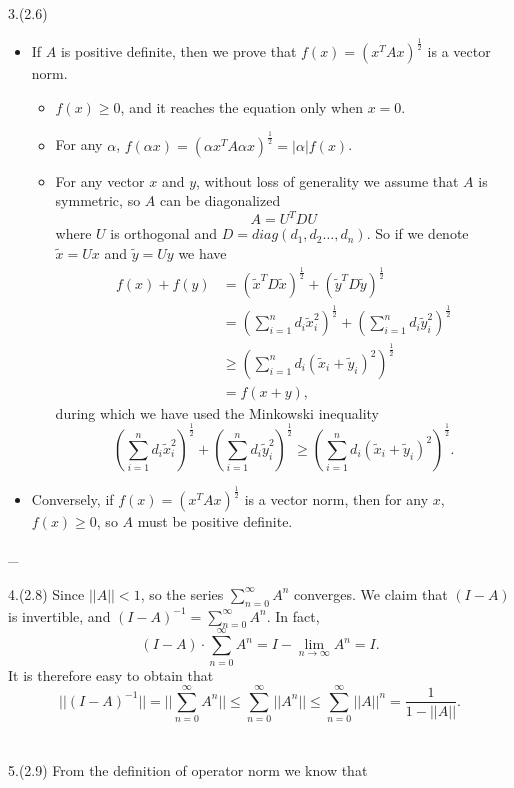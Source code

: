 \documentclass[11pt]{article}
\begin{document}
\\\\
3.(2.6)
\begin{itemize}
	\item If $A$ is positive definite, then we prove that $f(x)=\left(x^T A x\right)^{\frac{1}{2}}$ is a vector norm.
	\begin{itemize}
		\item $f(x) \ge 0$, and it reaches the equation only when $x=0$.
		\item For any $\alpha$, $f(\alpha x)=\left(\alpha x^T A \alpha x \right)^{\frac{1}{2}}=|\alpha|f(x)$.
		\item For any vector $x$ and $y$, without loss of generality we assume that $A$ is symmetric, so $A$ can be diagonalized $$A=U^TDU$$ where $U$ is orthogonal and $D=diag(d_1, d_2 \dots, d_n)$. So if we denote $\tilde{x} = Ux$ and $\tilde{y}=Uy$ we have 
		\begin{align*}
		f(x)+f(y) &= (\tilde{x}^TD\tilde{x})^{\frac{1}{2}}+(\tilde{y}^TD\tilde{y})^{\frac{1}{2}} \\
		&=\left(\sum_{i=1}^n d_i \tilde{x}^2_i\right)^{\frac{1}{2}} + \left(\sum_{i=1}^n d_i \tilde{y}^2_i\right)^{\frac{1}{2}} \\
		&\ge \left(\sum_{i=1}^n d_i (\tilde{x}_i+\tilde{y}_i)^2\right)^{\frac{1}{2}} \\
		&= f(x+y),
		\end{align*}
		during which we have used the Minkowski inequality $$\left(\sum_{i=1}^n d_i \tilde{x}^2_i\right)^{\frac{1}{2}} + \left(\sum_{i=1}^n d_i \tilde{y}^2_i\right)^{\frac{1}{2}} \ge \left(\sum_{i=1}^n d_i (\tilde{x}_i+\tilde{y}_i)^2\right)^{\frac{1}{2}}.$$
	\end{itemize}
	\item Conversely, if $f(x)=\left( x^T A  x \right)^{\frac{1}{2}}$ is a vector norm, then for any $x$, $f(x) \ge 0$, so $A$ must be positive definite.
\end{itemize}
\_
\\\\
4.(2.8) Since $||A|| < 1$, so the series $\sum_{n=0}^{\infty} A^n$ converges.
We claim that $(I-A)$ is invertible, and $(I-A)^{-1}=\sum_{n=0}^{\infty} A^n$.
In fact, $$(I-A)\cdot\sum_{n=0}^{\infty} A^n = I - \lim_{n\to \infty} A^n=I.$$
It is therefore easy to obtain that $$||(I-A)^{-1}|| = ||\sum_{n=0}^{\infty} A^n|| \le \sum_{n=0}^{\infty} ||A^n|| \le \sum_{n=0}^{\infty} ||A||^n = \frac{1}{1-||A||}.$$
\\\\
5.(2.9) From the definition of operator norm we know that
\end{document}
